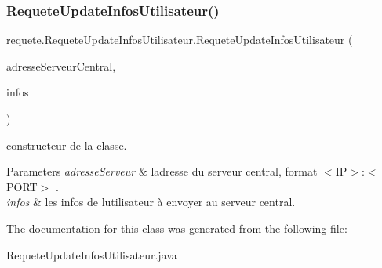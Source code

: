 \subsubsection{\texorpdfstring{Requete\+Update\+Infos\+Utilisateur()}{RequeteUpdateInfosUtilisateur()}}
{\footnotesize\ttfamily requete.\+Requete\+Update\+Infos\+Utilisateur.\+Requete\+Update\+Infos\+Utilisateur (\begin{DoxyParamCaption}\item[{String}]{adresse\+Serveur\+Central,  }\item[{\hyperlink{classcommun_1_1InfoUtilisateur}{Info\+Utilisateur}}]{infos }\end{DoxyParamCaption})\hspace{0.3cm}{\ttfamily [inline]}}



constructeur de la classe. 


\begin{DoxyParams}{Parameters}
{\em adresse\+Serveur} & l\textquotesingle{}adresse du serveur central, format $<$\+I\+P$>$\+:$<$\+P\+O\+R\+T$>$ . \\
\hline
{\em infos} & les infos de l\textquotesingle{}utilisateur à envoyer au serveur central. \\
\hline
\end{DoxyParams}


The documentation for this class was generated from the following file\+:\begin{DoxyCompactItemize}
\item 
Requete\+Update\+Infos\+Utilisateur.\+java\end{DoxyCompactItemize}
